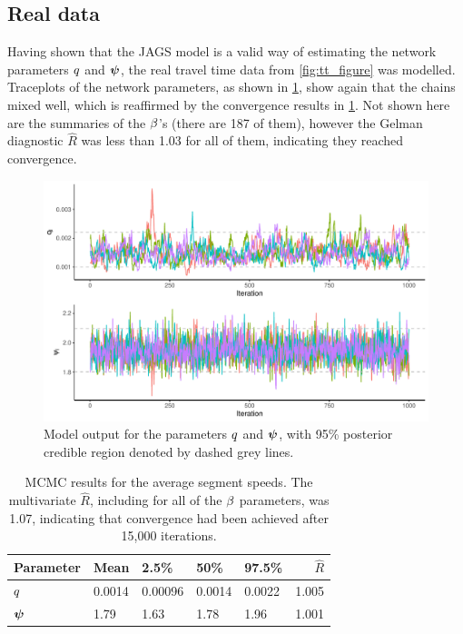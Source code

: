\subsection{Real data}
\label{nw_par_est_real}



Having shown that the JAGS model is a valid way of estimating the network parameters $\NWnoise$ and $\NWvar$, the real travel time data from \cref{fig:tt_figure} was modelled. Traceplots of the network parameters, as shown in \cref{fig:nw_model_n1_view}, show again that the chains mixed well, which is reaffirmed by the convergence results in \cref{tab:nw_model_fit_smry}. Not shown here are the summaries of the $\beta$'s (there are 187 of them), however the Gelman diagnostic $\hat R$ was less than 1.03 for all of them, indicating they reached convergence.

\begin{knitrout}\small
{}\color{fgcolor}\begin{figure}

{\centering \includegraphics[width=0.8\linewidth]{figure/nw_model_n1_view-1} 

}

\caption[Model output for the parameters $\NWnoise$ and $\NWvar$, with 95\% posterior credible region denoted by dashed grey lines]{Model output for the parameters $\NWnoise$ and $\NWvar$, with 95\% posterior credible region denoted by dashed grey lines.}\label{fig:nw_model_n1_view}
\end{figure}


\end{knitrout}

\begin{table}

\caption{\label{tab:nw_model_fit_smry}MCMC results for the average segment speeds. The multivariate $\hat R$, including for all of the $\beta$ parameters, was 1.07, indicating that convergence had been achieved after 15,000 iterations.}
\centering
\begin{tabular}[b]{lllllr}
\toprule
Parameter & Mean & 2.5\% & 50\% & 97.5\% & $\hat R$\\
\midrule
$\NWnoise$ & 0.0014 & 0.00096 & 0.0014 & 0.0022 & 1.005\\
$\NWvar$ & 1.79 & 1.63 & 1.78 & 1.96 & 1.001\\
\bottomrule
\end{tabular}
\end{table}



